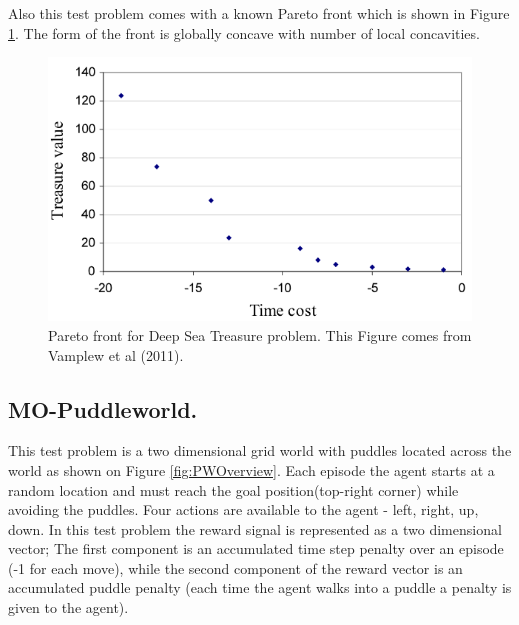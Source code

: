 {{Also this test problem comes with a known Pareto front which is shown in Figure \ref{fig:DSTFront}. The form of the front is globally concave with number of local concavities.

\begin{figure}[ht]
\vskip 0.2in
\centering
\includegraphics[scale=0.9]{dstPareto.png}
\caption{Pareto front for Deep Sea Treasure problem. This Figure comes from Vamplew et al (2011).}
\label{fig:DSTFront}
\end{figure}

\subsection{MO-Puddleworld.}
This test problem is a two dimensional grid world with puddles located across the world as shown on Figure \ref{fig:PWOverview}. Each episode the agent starts at a random location and must reach the goal position(top-right corner) while avoiding the puddles. Four actions are available to the agent - left, right, up, down. In this test problem the reward signal is represented as a two dimensional vector; The first component is an accumulated time step penalty over an episode (-1 for each move), while the second component of the reward vector is an accumulated puddle penalty (each time the agent walks into a puddle a penalty is given to the agent).

}}
